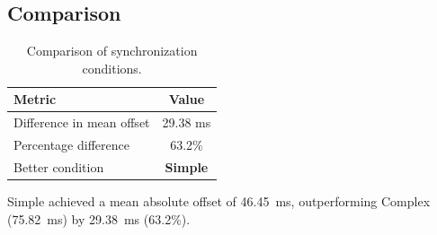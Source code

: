 \subsection*{Comparison}

\begin{table}[h!]
\centering
\begin{tabular}{|l|c|}
\hline
Metric & Value \\
\hline
Difference in mean offset & 29.38 ms \\
Percentage difference & 63.2\% \\
Better condition & \textbf{Simple} \\
\hline
\end{tabular}
\caption{Comparison of synchronization conditions.}
\label{tab:sync_comparison}
\end{table}

Simple achieved a mean absolute offset of 46.45~ms, outperforming Complex (75.82~ms) by 29.38~ms (63.2\%).
